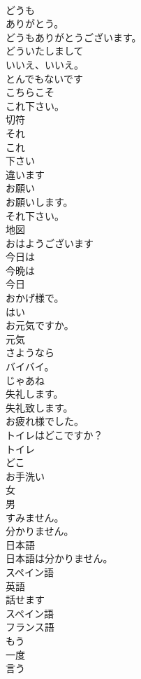 \documentclass[8pt]{extreport}
\begin{document}
\begin{CJK}{UTF8}{min}
\\	どうも
\\	ありがとう。
\\	どうもありがとうございます。
\\	どういたしまして
\\	いいえ、いいえ。
\\	とんでもないです
\\	こちらこそ
\\	これ下さい。
\\	切符
\\	それ
\\	これ
\\	下さい
\\	違います
\\	お願い
\\	お願いします。
\\	それ下さい。
\\	地図
\\	おはようございます
\\	今日は
\\	今晩は
\\	今日
\\	おかげ様で。
\\	はい
\\	お元気ですか。
\\	元気
\\	さようなら
\\	バイバイ。
\\	じゃあね
\\	失礼します。
\\	失礼致します。
\\	お疲れ様でした。
\\	トイレはどこですか？
\\	トイレ
\\	どこ
\\	お手洗い
\\	女
\\	男
\\	すみません。
\\	分かりません。
\\	日本語
\\	日本語は分かりません。
\\	スペイン語
\\	英語
\\	話せます
\\	スペイン語
\\	フランス語
\\	もう
\\	一度
\\	言う

\end{CJK}
\end{document}
